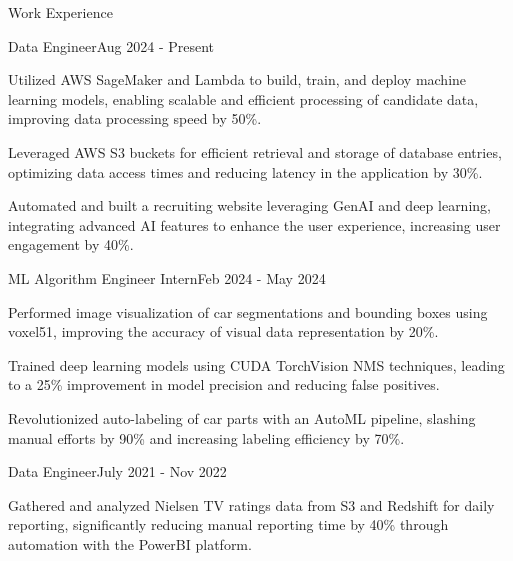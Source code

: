 \documentclass{resume} %
\begin{document}
    \begin{rSection}{Work Experience}
                    \begin{rSubsection}
                {Data Engineer}{Aug 2024 - Present}
                                    {}
                                {}
                                    \item Utilized AWS SageMaker and Lambda to build, train, and deploy machine learning models, enabling scalable and efficient processing of candidate data, improving data processing speed by 50\%.
                                    \item Leveraged AWS S3 buckets for efficient retrieval and storage of database entries, optimizing data access times and reducing latency in the application by 30\%.
                                    \item Automated and built a recruiting website leveraging GenAI and deep learning, integrating advanced AI features to enhance the user experience, increasing user engagement by 40\%.
                            \end{rSubsection}
                    \begin{rSubsection}
                {ML Algorithm Engineer Intern}{Feb 2024 - May 2024}
                                    {}
                                {}
                                    \item Performed image visualization of car segmentations and bounding boxes using voxel51, improving the accuracy of visual data representation by 20\%.
                                    \item Trained deep learning models using CUDA TorchVision NMS techniques, leading to a 25\% improvement in model precision and reducing false positives.
                                    \item Revolutionized auto{-}labeling of car parts with an AutoML pipeline, slashing manual efforts by 90\% and increasing labeling efficiency by 70\%.
                            \end{rSubsection}
                    \begin{rSubsection}
                {Data Engineer}{July 2021 - Nov 2022}
                                    {}
                                {}
                                    \item Gathered and analyzed Nielsen TV ratings data from S3 and Redshift for daily reporting, significantly reducing manual reporting time by 40\% through automation with the PowerBI platform.

\end{rSubsection}
\end{rSection}
\end{document}

